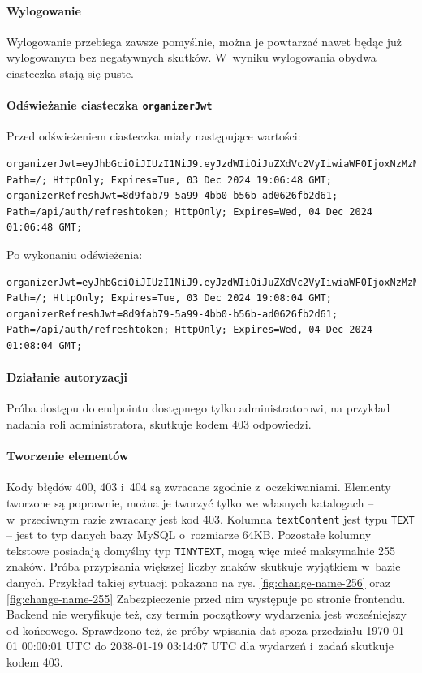 \documentclass[a4paper,twoside,12pt]{book}
\begin{document}
\paragraph{Wylogowanie}
Wylogowanie przebiega zawsze pomyślnie, można je powtarzać nawet będąc już wylogowanym bez negatywnych skutków. W~wyniku wylogowania obydwa ciasteczka stają się puste.

\paragraph{Odświeżanie ciasteczka \texttt{organizerJwt}}
Przed odświeżeniem ciasteczka miały następujące wartości:
\begin{verbatim}
organizerJwt=eyJhbGciOiJIUzI1NiJ9.eyJzdWIiOiJuZXdVc2VyIiwiaWF0IjoxNzMzMTY2NDA4LCJleHAiOjE3MzMyNTI4MDh9._JyoQNrhYdpdl3EPM8NFg29c0HwLm5nMidQ8Fh4Wsik; Path=/; HttpOnly; Expires=Tue, 03 Dec 2024 19:06:48 GMT;
organizerRefreshJwt=8d9fab79-5a99-4bb0-b56b-ad0626fb2d61; Path=/api/auth/refreshtoken; HttpOnly; Expires=Wed, 04 Dec 2024 01:06:48 GMT;
\end{verbatim}
Po wykonaniu odświeżenia:
\begin{verbatim}
organizerJwt=eyJhbGciOiJIUzI1NiJ9.eyJzdWIiOiJuZXdVc2VyIiwiaWF0IjoxNzMzMTY2NDg0LCJleHAiOjE3MzMyNTI4ODR9.ekR8DYMFlny3pKLKaunjOtXXTE3qH8dTfEFGYdaSpNs; Path=/; HttpOnly; Expires=Tue, 03 Dec 2024 19:08:04 GMT;
organizerRefreshJwt=8d9fab79-5a99-4bb0-b56b-ad0626fb2d61; Path=/api/auth/refreshtoken; HttpOnly; Expires=Wed, 04 Dec 2024 01:08:04 GMT;
\end{verbatim}

\paragraph{Działanie autoryzacji}
Próba dostępu do endpointu dostępnego tylko administratorowi, na przykład nadania roli administratora, skutkuje kodem 403 odpowiedzi.

\paragraph{Tworzenie elementów}
Kody błędów 400, 403 i~404 są zwracane zgodnie z~oczekiwaniami. Elementy tworzone są poprawnie, można je tworzyć tylko we własnych katalogach -- w~przeciwnym razie zwracany jest kod 403. Kolumna \texttt{textContent} jest typu \texttt{TEXT} -- jest to typ danych bazy MySQL o~rozmiarze 64KB. Pozostałe kolumny tekstowe posiadają domyślny typ \texttt{TINYTEXT}, mogą więc mieć maksymalnie 255 znaków. Próba przypisania większej liczby znaków skutkuje wyjątkiem w~bazie danych. Przykład takiej sytuacji pokazano na rys. \ref{fig:change-name-256} oraz \ref{fig:change-name-255} Zabezpieczenie przed nim występuje po stronie frontendu. Backend nie weryfikuje też, czy termin początkowy wydarzenia jest wcześniejszy od końcowego. Sprawdzono też, że próby wpisania dat spoza przedziału 1970-01-01 00:00:01 UTC do 2038-01-19 03:14:07 UTC dla wydarzeń i~zadań skutkuje kodem 403.
\end{document}
